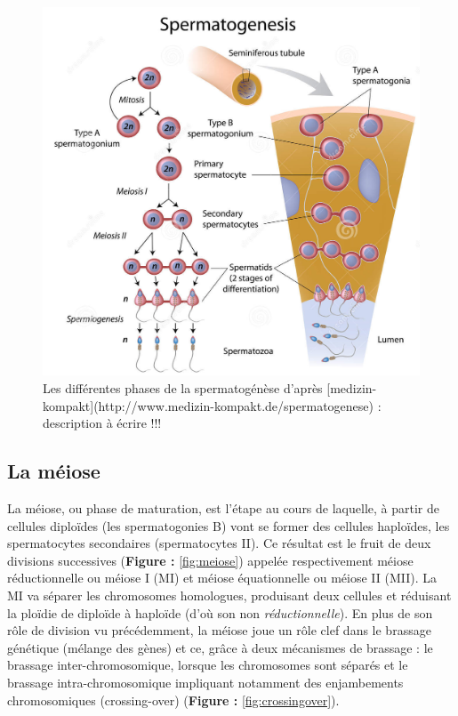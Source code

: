 \documentclass[12pt,twoside]{reedthesis}
\theoremstyle{definition}
\theoremstyle{definition}
\theoremstyle{remark}
\begin{document}
  \begin{figure}
  
  {\centering \includegraphics[scale=0.35]{figure/spermatogenese2} 
  
  }
  
  \caption{Les différentes phases de la spermatogénèse d'après [medizin-kompakt](http://www.medizin-kompakt.de/spermatogenese) : description à écrire !!!}\label{fig:spermatogenese}
  \end{figure}
  
  \newpage 
  
  \hypertarget{meiose}{\subsection{La méiose}\label{meiose}}
  
  La méiose, ou phase de maturation, est l'étape au cours de laquelle, à
  partir de cellules diploïdes (les spermatogonies B) vont se former des
  cellules haploïdes, les spermatocytes secondaires (spermatocytes II). Ce
  résultat est le fruit de deux divisions successives (\textbf{Figure :
  }\ref{fig:meiose}) appelée respectivement méiose réductionnelle ou
  méiose I (MI) et méiose équationnelle ou méiose II (MII). La MI va
  séparer les chromosomes homologues, produisant deux cellules et
  réduisant la ploïdie de diploïde à haploïde (d'où son non
  \emph{réductionnelle}). En plus de son rôle de division vu précédemment,
  la méiose joue un rôle clef dans le brassage génétique (mélange des
  gènes) et ce, grâce à deux mécanismes de brassage : le brassage
  inter-chromosomique, lorsque les chromosomes sont séparés et le brassage
  intra-chromosomique impliquant notamment des enjambements chromosomiques
  (crossing-over) (\textbf{Figure : }\ref{fig:crossingover}).
  
\end{document}
